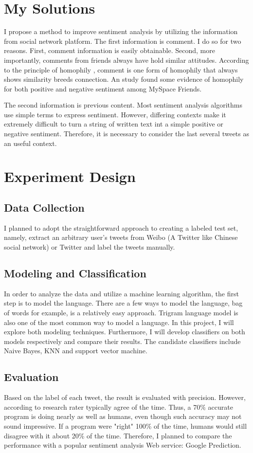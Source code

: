 \documentclass{article}
\begin{document}
\section*{My Solutions}
I propose a method to improve sentiment analysis by utilizing the information from social network platform. The first information is comment. 
I do so for two reasons. First, comment information is easily obtainable. Second, more importantly, comments from friends always 
have hold similar attitudes. According to the principle of homophily \cite{lazarsfeld1954fsp}, comment is one form of homophily that always shows similarity breeds connection.
An study \cite{thelwall2010emotion} found some evidence of homophily for both positive and negative sentiment among MySpace Friends.

The second information is previous content. Most sentiment analysis algorithms use simple terms to express sentiment. However, differing 
contexts make it extremely difficult to turn a string of written text int a simple positive or negative sentiment. Therefore, it is necessary to 
consider the last several tweets as an useful context.
\section*{Experiment Design}
\subsection*{Data Collection}
I planned to adopt the straightforward approach to creating a labeled test set, namely, 
extract an arbitrary user's tweets from Weibo (A Twitter like Chinese social network) or Twitter and label the tweets manually.
\subsection*{Modeling and Classification}
In order to analyze the data and utilize a machine learning algorithm, the first step is to model the language. 
There are a few ways to model the language, bag of words for example, is a relatively easy approach. 
Trigram language model is also one of the most common way to model a language. 
In this project, I will explore both modeling techniques. Furthermore, I will develop classifiers on both models respectively and compare their results.
The candidate classifiers include Naive Bayes, KNN and support vector machine.
\subsection*{Evaluation}
Based on the label of each tweet, the result is evaluated with precision.
However, according to research rater typically agree \cite{og} of the time. Thus, a 70\% accurate program is doing nearly as well as humans,
even though such accuracy may not sound impressive. If a program were "right" 100\% of the time, humans would still disagree with it about 20\%
of the time. Therefore, I planned to compare the performance with a popular sentiment analysis Web service: Google Prediction.
\end{document}

